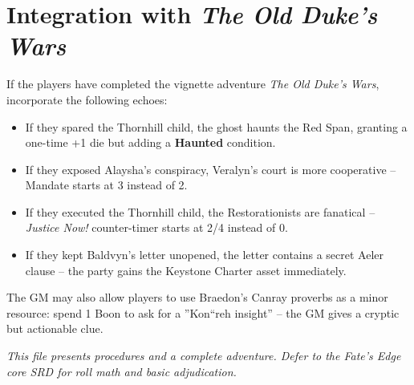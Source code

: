 \documentclass[11pt]{article}
\begin{document}
\section*{Integration with \textit{The Old Duke's Wars}}
If the players have completed the vignette adventure \textit{The Old Duke's Wars}, incorporate the following echoes:
\begin{itemize}
  \item If they spared the Thornhill child, the ghost haunts the Red Span, granting a one-time +1 die but adding a \textbf{Haunted} condition.
  \item If they exposed Alaysha's conspiracy, Veralyn's court is more cooperative -- Mandate starts at 3 instead of 2.
  \item If they executed the Thornhill child, the Restorationists are fanatical -- \textit{Justice Now!} counter-timer starts at 2/4 instead of 0.
  \item If they kept Baldvyn's letter unopened, the letter contains a secret Aeler clause -- the party gains the Keystone Charter asset immediately.
\end{itemize}
The GM may also allow players to use Braedon's Canray proverbs as a minor resource: spend 1 Boon to ask for a ''Kon``reh insight'' -- the GM gives a cryptic but actionable clue.

\vfill
\begin{center}\small \emph{This file presents procedures and a complete adventure. Defer to the Fate's Edge core SRD for roll math and basic adjudication.}\end{center}
\end{document}
